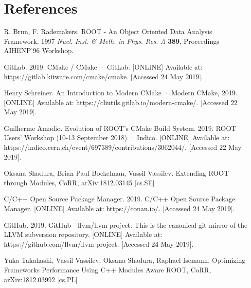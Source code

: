 \documentclass[12pt]{iopart}
\begin{document}
\section*{References}
\begin{thebibliography}{10}

R. Brun, F. Rademakers. ROOT - An Object Oriented Data Analysis Framework. 1997 {\it Nucl. Inst. \& Meth. in Phys. Res. A } \textbf{389}, Proceedings AIHENP'96 Workshop.

GitLab. 2019. CMake / CMake · GitLab. [ONLINE] Available at: https://gitlab.kitware.com/cmake/cmake. [Accessed 24 May 2019]. 

Henry Schreiner. An Introduction to Modern CMake · Modern CMake, 2019. [ONLINE] Available at: https://cliutils.gitlab.io/modern-cmake/. [Accessed 22 May 2019]. 

Guilherme Amadio. Evolution of ROOT's CMake Build System. 2019. ROOT Users' Workshop (10-13 September 2018) · Indico. [ONLINE] Available at: https://indico.cern.ch/event/697389/contributions/3062044/. [Accessed 22 May 2019].

Oksana Shadura, Brian Paul Bockelman, Vassil Vassilev. Extending ROOT through Modules, CoRR, arXiv:1812.03145 [cs.SE]

C/C++ Open Source Package Manager. 2019. C/C++ Open Source Package Manager. [ONLINE] Available at: https://conan.io/. [Accessed 24 May 2019]. 

GitHub. 2019. GitHub - llvm/llvm-project: This is the canonical git mirror of the LLVM subversion repository. [ONLINE] Available at: https://github.com/llvm/llvm-project. [Accessed 24 May 2019]. 

Yuka Takahashi, Vassil Vassilev, Oksana Shadura, Raphael Isemann. Optimizing Frameworks Performance Using C++ Modules Aware ROOT, CoRR, arXiv:1812.03992 [cs.PL]

\end{thebibliography}
\end{document}
